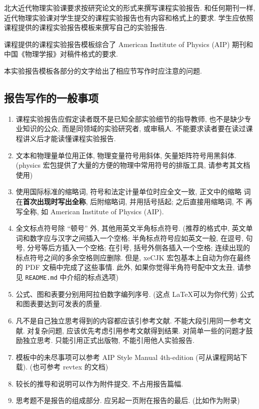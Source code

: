\documentclass[notofandol]{mpltx}
\newcommand{\note}[1]{{\color{gray}#1}}
\begin{document}
北大近代物理实验课要求按研究论文的形式来撰写课程实验报告.
和任何期刊一样, 近代物理实验课对学生提交的课程实验报告也有内容和格式上的要求.
学生应依照课程提供的课程实验报告模板来撰写自己的实验报告.

课程提供的课程实验报告模板综合了 American Institute of Physics (AIP) 期刊和中国《物理学报》对稿件格式的要求.

本实验报告模板各部分的文字给出了相应节写作时应注意的问题.

\subsection*{报告写作的一般事项}

\begin{enumerate}
    \item 课程实验报告应假定读者既不是已知全部实验细节的指导教师, 也不是缺少专业知识的公众, 而是同领域的实验研究者, 或审稿人.
          不能要求读者要在读过课程讲义后才能读懂课程实验报告.
    \item 文本和物理量单位用正体, 物理变量符号用斜体, 矢量矩阵符号用黑斜体.
          \note{(\textsf{physics} 宏包提供了大量的方便的物理中常用符号的排版工具, 请参考其文档使用)}
    \item 使用国际标准的缩略词, 符号和法定计量单位时应全文一致, 正文中的缩略
          词在\textbf{首次出现时写出全称}, 后附缩略词, 并用括号括起; 之后直接用缩略词, 不
          再写全称, 如 American Institute of Physics (AIP).
    \item 全文标点符号除 ``顿号'' 外, 其他用英文半角标点符号.
          \note{(推荐的格式中, 英文单词和数字应与汉字之间插入一个空格;
              半角标点符号应如英文一般, 在逗号, 句号, 分号等后方插入一个空格;
              在引号, 括号外侧各插入一个空格;
              连续出现的标点符号之间的多余空格则应删除.
              但是, \textsf{xeCJK} 宏包基本上自动为你在最终的 PDF 文稿中完成了这些事情.
              此外, 如果你觉得半角符号配中文太丑, 请参见 \texttt{README.md} 中介绍的标点选项)}
    \item 公式、图和表要分别用阿拉伯数字编列序号. \note{(这点 \LaTeX 可以为你代劳)}
          公式和图表要达到可发表的质量.
    \item 凡不是自己独立思考得到的内容都应该引参考文献.
          不能大段引用同一参考文献.
          对复杂问题, 应该优先考虑引用参考文献得到结果.
          对简单一些的问题才鼓励独立思考.
          只能引用正式出版物, 不能引用他人实验报告.
    \item 模板中的未尽事项可以参考 AIP Style Manual 4th-edition (可从课程网站下载).
          \note{(也可参考 \textsf{revtex} 的文档)}
    \item 较长的推导和说明可以作为附件提交, 不占用报告篇幅.
    \item 思考题不是报告的组成部分.
          应另起一页附在报告的最后. \note{(比如作为附录)}
\end{enumerate}
\end{document}

